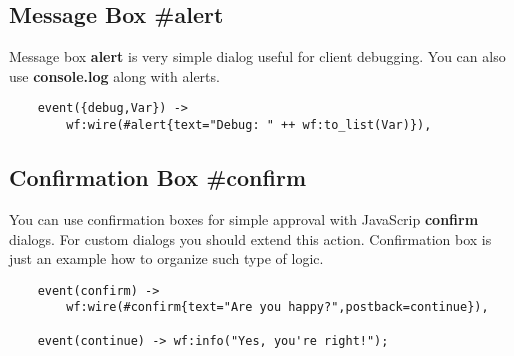 \subsection{Message Box \#alert}
Message box {\bf alert} is very simple dialog useful for client debugging.
You can also use {\bf console.log} along with alerts.

\vspace{1\baselineskip}
\begin{lstlisting}
    event({debug,Var}) ->
        wf:wire(#alert{text="Debug: " ++ wf:to_list(Var)}),
\end{lstlisting}

\subsection{Confirmation Box \#confirm}
You can use confirmation boxes for simple approval with JavaScrip {\bf confirm} dialogs.
For custom dialogs you should extend this action. Confirmation box is just an example how to
organize such type of logic.

\vspace{1\baselineskip}
\begin{lstlisting}
    event(confirm) ->
        wf:wire(#confirm{text="Are you happy?",postback=continue}),

    event(continue) -> wf:info("Yes, you're right!");
\end{lstlisting}
\vspace{1\baselineskip}
